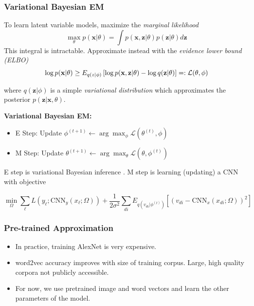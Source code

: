\documentclass{beamer}
\begin{document}
\begin{frame}
  \frametitle{Variational Bayesian EM}
  To learn latent variable models, maximize the \emph{marginal likelihood}
  \[
  \max_{\theta}p(\mathbf{x}|\theta)=\int p(\mathbf{x},\mathbf{z}|\theta)p(\mathbf{z}|\theta)d\mathbf{z}
  \]
  This integral is intractable. Approximate instead with the \emph{evidence lower bound (ELBO)}
  \[
  \log p(\mathbf{x}|\theta)\geq E_{q(z|\phi)}\left[\log p(\mathbf{x},\mathbf{z}|\theta)-\log q(\mathbf{z}|\theta)\right]=:{\cal L}(\theta,\phi)
  \]
  {\small where $q(\mathbf{z}|\phi)$ is a simple \emph{variational distribution} which approximates the posterior $p(\mathbf{z}|\mathbf{x},\theta)$. \par}
  \textbf{Variational Bayesian EM:}
  \begin{itemize}
  \item E Step: Update $\phi^{(t+1)}\leftarrow\arg\max_{\phi}\mathcal{L}(\theta^{(t)},\phi)$
  \item M Step: Update $\theta^{(t+1)}\leftarrow\arg\max_{\theta}\mathcal{L}(\theta,\phi^{(t)})$
  \end{itemize}
  {\small 
    E step is variational Bayesian inference \citep{WangC13, Ranganath14}. M step is learning (updating) a CNN with objective
    \par}
  \[ \min_\Omega \sum_\ell L(y_\ell ; \text{CNN}_y(x_\ell ; \Omega)) + \frac{1}{2\sigma^2} \sum_{di} E_{q(v_{di}|\phi^(t))} \left[ (v_{di} - \text{CNN}_x(x_{di} ; \Omega))^2 \right] \]
\end{frame}

\begin{frame}
  \frametitle{Pre-trained Approximation}
  \begin{itemize}
    \item In practice, training AlexNet is very expensive.
    \item word2vec accuracy improves with size of training corpus. Large, high quality corpora not publicly accessible.
    \item For now, we use pretrained image and word vectors and learn the other parameters of the model.
  \end{itemize}
\end{frame}
\end{document}
